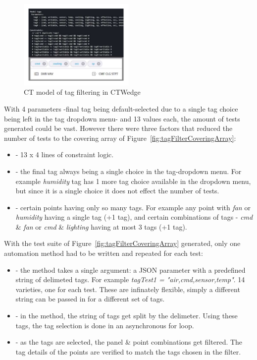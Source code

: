 \documentclass[conference]{IEEEtran}
\begin{document}
	\begin{figure}[!h]
		\includegraphics[width=0.50\textwidth,]{tagFilterModel.pdf}
		\caption{CT model of tag filtering in CTWedge}
		\label{fig:tagFilterModel}
	\end{figure}

	With 4 parameters -final tag being default-selected due to a single tag choice being left in the tag dropdown menu- and 13 values each, the amount of tests generated could be vast. 
	However there were three factors that reduced the number of tests to the covering array of Figure~\ref{fig:tagFilterCoveringArray}:
	
	\begin{itemize}
		\item [] - 13 x 4 lines of constraint logic.
		\item [] - the final tag always being a single choice in the tag-dropdown menu. For example \textit{humidity} tag has 1 more tag choice available in the dropdown menu, but since it is a single choice it does not effect the number of tests.
		\item [] - certain points having only so many tags. For example any point with \textit{fan} or \textit{humidity} having a single tag (+1 tag), and certain combinations of tags - \textit{cmd} \& \textit{fan} or \textit{cmd} \& \textit{lighting} having at most 3 tags (+1 tag).
	\end{itemize}

	With the test suite of Figure~\ref{fig:tagFilterCoveringArray} generated, only one automation method had to be written and repeated for each test:
	
	\begin{itemize}
		\item [] - the method takes a single argument: a JSON parameter with a predefined string of delimeted tags. For example \textit{tagTest1 = "air,cmd,sensor,temp"}. 14 varieties, one for each test. These are infinately flexible, simply a different string can be passed in for a different set of tags.
		\item [] - in the method, the string of tags get split by the delimeter. Using these tags, the tag selection is done in an asynchronous for loop. 
		\item [] - as the tags are selected, the panel \& point combinations get filtered. The tag details of the points are verified to match the tags chosen in the filter.
	\end{itemize}
\end{document}
